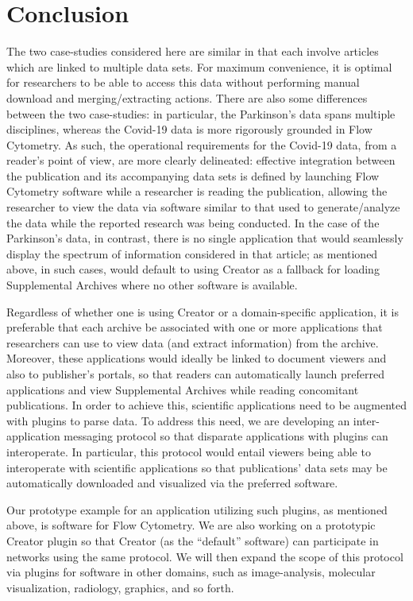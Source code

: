 \documentclass[12pt,letterpaper]{article}
\newcommand{\ATexttclr}[1]{\textcolor{tcolor}{\textbf{#1}}}
\newcommand{\ThreeD}{\resizebox{!}{8pt}{\AcronymText{3D}}}
\newcommand{\textscc}[1]{{\color{orr!35!black}{{%
{\textsc{\textbf{#1}}}}}}}
\newcommand{\AcronymText}[1]{{\textscc{#1}}}
\newcommand{\SDRF}{\resizebox{!}{8pt}{\ATexttclr{S}}\resizebox{!}{8pt}{\ATexttclr{DR%
\hspace{1pt}{\raisebox{-1pt}{\fontfamily{qhv}\fontseries{b}\selectfont{}\Large{F}}%
}}}}
\newcommand{\Qt}{\resizebox{!}{8pt}{\AcronymText{Qt}}}
\newcommand{\PDF}{\resizebox{!}{8pt}{\AcronymText{PDF}}}
\newcommand{\p}[1]{

\vspace{.7em}#1}
\newcommand{\q}[1]{{\fontfamily{qcr}\selectfont ``}#1{\fontfamily{qcr}\selectfont ''}}
\begin{document}
{\vspace{-6pt}
\section{Conclusion}
\p{The two case-studies considered here are similar in that 
each involve articles which are linked to multiple data sets. 
For maximum convenience, it is optimal for researchers 
to be able to access this data without performing 
manual download and merging/extracting actions.  
There are also some differences between the two 
case-studies: in particular, the 
Parkinson's data spans multiple disciplines, whereas the 
Covid-19 data is more rigorously grounded in Flow Cytometry.  
As such, the operational requirements for the Covid-19 data, 
from a reader's point of view, are more clearly delineated: 
effective integration between the publication and its 
accompanying data sets is defined by launching Flow Cytometry 
software while a researcher is reading the publication, 
allowing the researcher to view the data via software 
similar to that used to generate/analyze the data 
while the reported research was being conducted.  In 
the case of the Parkinson's data, in contrast, there is no single 
application that would seamlessly display the spectrum 
of information considered in that article; as 
mentioned above, in such cases, \SDRF{} would default to using 
\Qt{} Creator as a fallback for loading Supplemental 
Archives where no other software is available.}

\p{Regardless of whether one is using \Qt{} Creator or 
a domain-specific application, 
it is preferable that each \SDRF{} archive be associated 
with one or more applications that researchers can use 
to view data (and extract information) from the archive.  
Moreover, these applications would ideally be linked 
to document viewers and also to publisher's portals, 
so that readers can automatically launch preferred 
applications and view Supplemental Archives while 
reading concomitant publications.  In order to achieve 
this, scientific applications need to be augmented 
with plugins to parse \SDRF{} data.   
To address this need, we are developing an inter-application messaging protocol 
so that disparate applications with \SDRF{} plugins 
can interoperate.  In particular, this protocol would 
entail \PDF{} viewers being able to 
interoperate with scientific applications so that 
publications' data sets may be automatically downloaded 
and visualized via the preferred software.}

\p{Our prototype example for an application utilizing such 
plugins, as mentioned above, is software for 
Flow Cytometry.  We are also working on a prototypic \Qt{} Creator 
plugin so that \Qt{} Creator (as the \q{default} \SDRF{} 
software) can participate in \SDRF{} networks using the 
same protocol.  We will then expand the scope of 
this protocol via plugins for software in other domains,  
such as image-analysis, molecular visualization, 
radiology, \ThreeD{} graphics, and so forth.}

}
\end{document}
